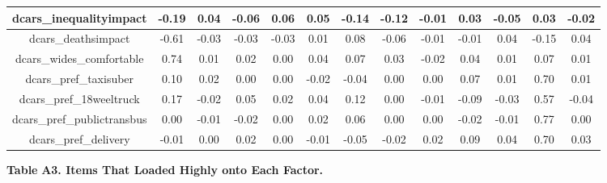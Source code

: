 {\begin{tabular}{c | c | c | c | c | c | c | c | c | c | c | c | c}
  \hline
  dcars\_inequalityimpact & -0.19 & 0.04 & -0.06 & 0.06 & 0.05 & -0.14 & -0.12 & -0.01 & 0.03 & -0.05 & 0.03 & -0.02 \\
  \hline
  dcars\_deathsimpact & -0.61 & -0.03 & -0.03 & -0.03 & 0.01 & 0.08 & -0.06 & -0.01 & -0.01 & 0.04 & -0.15 & 0.04 \\
  \hline
  dcars\_wides\_comfortable & 0.74 & 0.01 & 0.02 & 0.00 & 0.04 & 0.07 & 0.03 & -0.02 & 0.04 & 0.01 & 0.07 & 0.01 \\
  \hline
  dcars\_pref\_taxisuber & 0.10 & 0.02 & 0.00 & 0.00 & -0.02 & -0.04 & 0.00 & 0.00 & 0.07 & 0.01 & 0.70 & 0.01 \\
  \hline
  dcars\_pref\_18weeltruck & 0.17 & -0.02 & 0.05 & 0.02 & 0.04 & 0.12 & 0.00 & -0.01 & -0.09 & -0.03 & 0.57 & -0.04 \\
  \hline
  dcars\_pref\_publictransbus & 0.00 & -0.01 & -0.02 & 0.00 & 0.02 & 0.06 & 0.00 & 0.00 & -0.02 & -0.01 & 0.77 & 0.00 \\
  \hline
  dcars\_pref\_delivery & -0.01 & 0.00 & 0.02 & 0.00 & -0.01 & -0.05 & -0.02 & 0.02 & 0.09 & 0.04 & 0.70 & 0.03 \\
  \hline
\end{tabular}
}

\textbf{Table}\textbf{ A3. Items That Loaded Highly onto Each Factor.}

